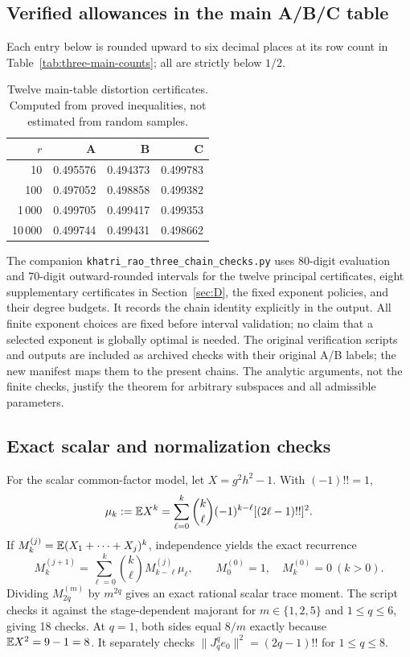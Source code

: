 \documentclass[11pt]{article}
\numberwithin{equation}{section}
\theoremstyle{definition}\newtheorem{definition}[theorem]{Definition}
\theoremstyle{remark}\newtheorem{remark}[theorem]{Remark}
\newcommand{\norm}[1]{\lVert#1\rVert}\newcommand{\ip}[2]{\langle#1,#2\rangle}
\begin{document}
\subsection{Verified allowances in the main A/B/C table}
Each entry below is rounded upward to six decimal places at its row count in
Table~\ref{tab:three-main-counts}; all are strictly below $1/2$.
\begin{table}[H]\centering\small
\setlength{\tabcolsep}{12pt}\renewcommand{\arraystretch}{1.2}
\begin{tabular}{@{}rrrr@{}}
\toprule
$r$&\textbf{A}&\textbf{B}&\textbf{C}\\
\midrule
10&0.495576&0.494373&0.499783\\
100&0.497052&0.498858&0.499382\\
1\,000&0.499705&0.499417&0.499353\\
10\,000&0.499744&0.499431&0.498662\\
\bottomrule
\end{tabular}
\caption{Twelve main-table distortion certificates. Computed from proved
inequalities, not estimated from random samples.}\label{tab:allowances}
\end{table}

The companion \texttt{khatri\_rao\_three\_chain\_checks.py} uses 80-digit evaluation
and 70-digit outward-rounded intervals for the twelve principal certificates,
eight supplementary certificates in Section~\ref{sec:D}, the fixed exponent
policies, and their degree budgets. It records the chain identity explicitly in
the output. All finite exponent choices are fixed before interval validation;
no claim that a selected exponent is globally optimal is needed.
The original verification scripts and outputs are included as archived checks
with their original A/B labels; the new manifest maps them to the present chains.
The analytic arguments, not the finite checks, justify the theorem for arbitrary
subspaces and all admissible parameters.

\subsection{Exact scalar and normalization checks}
For the scalar common-factor model, let $X=g^2h^2-1$. With $(-1)!!=1$,
\begin{equation}\label{eq:scalar-check}
 \mu_k:=\mathbb E X^k
 =\sum_{\ell=0}^k\binom{k}{\ell}(-1)^{k-\ell}[(2\ell-1)!!]^2.
\end{equation}
If $M_k^{(j)}=\mathbb E(X_1+\cdots+X_j)^k$, independence yields the exact recurrence
\[
 M_k^{(j+1)}=\sum_{\ell=0}^k\binom{k}{\ell}M_{k-\ell}^{(j)}\mu_\ell,
 \qquad M_0^{(0)}=1,\quad M_k^{(0)}=0\ (k>0).
\]
Dividing $M_{2q}^{(m)}$ by $m^{2q}$ gives an exact rational scalar trace moment.
The script checks it against the stage-dependent majorant for
$m\in\{1,2,5\}$ and $1\le q\le6$, giving 18 checks.
At $q=1$, both sides equal $8/m$ exactly because $\mathbb E X^2=9-1=8$.
It separately checks
$\norm{J_q^qe_0}^2=(2q-1)!!$ for $1\le q\le8$.
\end{document}
